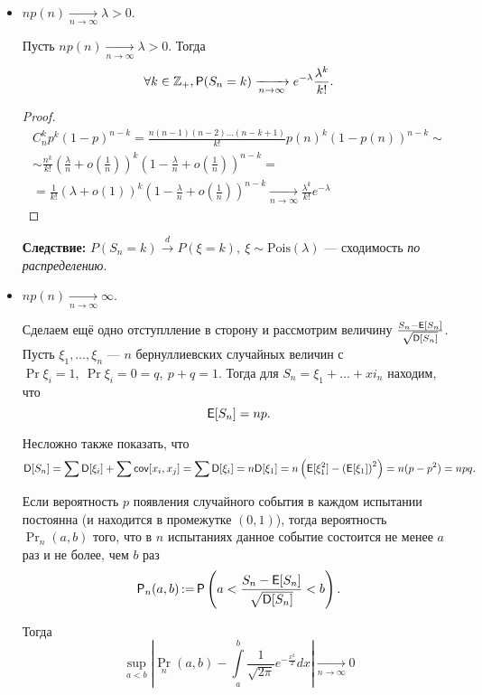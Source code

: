 \begin{itemize}
    \item
        $np(n) \xrightarrow[n\to\infty]{} \lambda > 0$. 

        \begin{theorem}[Пуассон]

            Пусть $np(n) \xrightarrow[n\to\infty]{} \lambda > 0$. 
            Тогда 
                \[
                    \forall k \in \Z_+, \Pr(S_n = k) \xrightarrow[n\to\infty]{} e^{-\lambda}\frac{\lambda^k}{k!}.
                \]
        \end{theorem}
        \begin{proof}
            \begin{multline*}
                C_n^kp^k(1-p)^{n-k} =
                \frac{n(n-1)(n-2)\ldots(n-k+1)}{k!}p(n)^k(1-p(n))^{n-k} \sim\\\sim
                \frac{n^k}{k!}\left(\frac{\lambda}{n}+o\left(\frac{1}{n}\right)\right)^k\left( 1-\frac{\lambda}{n}+o\left( \frac{1}{n} \right) \right)^{n-k} =\\=
                \frac{1}{k!}\left(\lambda+o\left(1\right)\right)^k\left( 1-\frac{\lambda}{n}+o\left( \frac{1}{n} \right) \right)^{n-k} \xrightarrow[n\to\infty]{}
                \frac{\lambda^k}{k!}e^{-\lambda}
            \end{multline*}
        \end{proof}
        \textbf{Следствие:} $P(S_n = k) \overset{d}{\to} P(\xi = k),\ \xi \sim \mathrm{Pois}(\lambda)$ --- сходимость \emph{по распределению}.

    \item
        $np(n) \xrightarrow[n\to\infty]{} \infty$. 

        Сделаем ещё одно отступлление в сторону и рассмотрим величину $\frac{S_n - \E[S_n]}{\sqrt{\D[S_n]}}$.
        Пусть \(\xi_1, \ldots, \xi_n \) --- $ n $ бернуллиевских случайных величин с \(\Pr{\xi_i = 1},\ \Pr{\xi_i = 0} = q,\ p + q = 1. \) Тогда для \(S_n = \xi_1 + \ldots + xi_n \) 
        находим, что 
        \[
            \E[S_n] = np.
        \]
        
        Несложно также показать, что 
        \[
            \D[S_n] = \sum\D[\xi_i] + \sum\cov[x_i, x_j] = \sum\D[\xi_i] = n\D[\xi_1] = n\left( \E[\xi_1^2]-\left( \E[\xi_1] \right)^2 \right) = n(p - p^2) = npq.
        \]

        \begin{theorem}
           Если вероятность $p$ появления случайного события в каждом испытании постоянна (и находится в промежутке $ (0, 1) $), тогда вероятность $ \Pr_n(a, b) $ того, что в $ n $ испытаниях данное событие состоится не менее $ a $ раз и не более, чем $ b $ раз
            \[
                \Pr_n(a,b)\mathop{:=} \Pr\left( a < \frac{S_n - \E[S_n]}{\sqrt{\D[S_n]}} < b \right).
            \]

            Тогда 
            \[
                \sup_{a<b} \left|\Pr_n(a, b) - \int\limits_a^b\frac{1}{\sqrt{2\pi}}e^{-\frac{x^{2}}{2}}dx\right| \xrightarrow[n\to\infty]{} 0
            \]
        \end{theorem}
    
\end{itemize}

